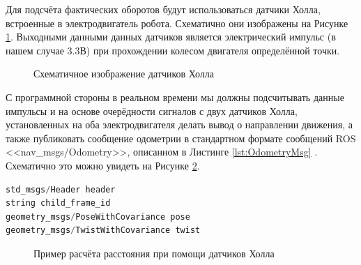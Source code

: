 \documentclass[12pt,a4paper]{scrartcl}
\begin{document}
					Для подсчёта фактических оборотов будут использоваться датчики Холла, встроенные в электродвигатель робота. Схематично они изображены на Рисунке \ref{fig:EncoderPrincipe}\cite{bib:Odometry}. Выходными данными данных датчиков является электрический импульс (в нашем случае 3.3В) при прохождении колесом двигателя определённой точки\cite{bib:HoleSensors}.
					
					\begin{figure}[h]
						\caption{Схематичное изображение датчиков Холла}
						\label{fig:EncoderPrincipe}
					\end{figure}
					
					С программной стороны в реальном времени мы должны подсчитывать данные импульсы и на основе очерёдности сигналов с двух датчиков Холла, установленных на оба электродвигателя делать вывод о направлении движения, а также публиковать сообщение одометрии в стандартном формате сообщений ROS <<nav\_msgs/Odometry>>, описанном в Листинге \ref{lst:OdometryMsg} \cite{bib:ROSOdometryMsg}. Схематично это можно увидеть на Рисунке \ref{fig:OdometryPathLength}.
					
					\begin{lstlisting}[language=C,caption={Формат сообщения nav\_msgs/Odometry},label={lst:OdometryMsg}]
std_msgs/Header header
string child_frame_id
geometry_msgs/PoseWithCovariance pose
geometry_msgs/TwistWithCovariance twist
					\end{lstlisting}	
					
					\begin{figure}[h]
						\caption{Пример расчёта расстояния при помощи датчиков Холла}
						\label{fig:OdometryPathLength}
					\end{figure}
					
\end{document}
